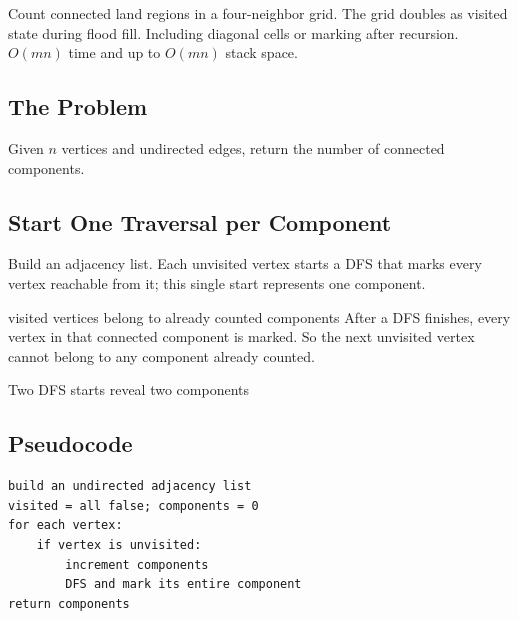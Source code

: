 \chaptercheckpoint
  {Count connected land regions in a four-neighbor grid.}
  {The grid doubles as visited state during flood fill.}
  {Including diagonal cells or marking after recursion.}
  {$O(mn)$ time and up to $O(mn)$ stack space.}



\subsection{The Problem}
Given \(n\) vertices and undirected edges, return the number of connected
components.

\subsection{Start One Traversal per Component}
Build an adjacency list. Each unvisited vertex starts a DFS that marks every
vertex reachable from it; this single start represents one component.

\begin{invariantbox}{visited vertices belong to already counted components}
After a DFS finishes, every vertex in that connected component is marked.
So the next unvisited vertex cannot belong to any component already counted.
\end{invariantbox}

\begin{visualbox}{Two DFS starts reveal two components}
\centering
{}
\end{visualbox}

\subsection{Pseudocode}
\begin{lstlisting}[style=pseudocode]
build an undirected adjacency list
visited = all false; components = 0
for each vertex:
    if vertex is unvisited:
        increment components
        DFS and mark its entire component
return components
\end{lstlisting}

